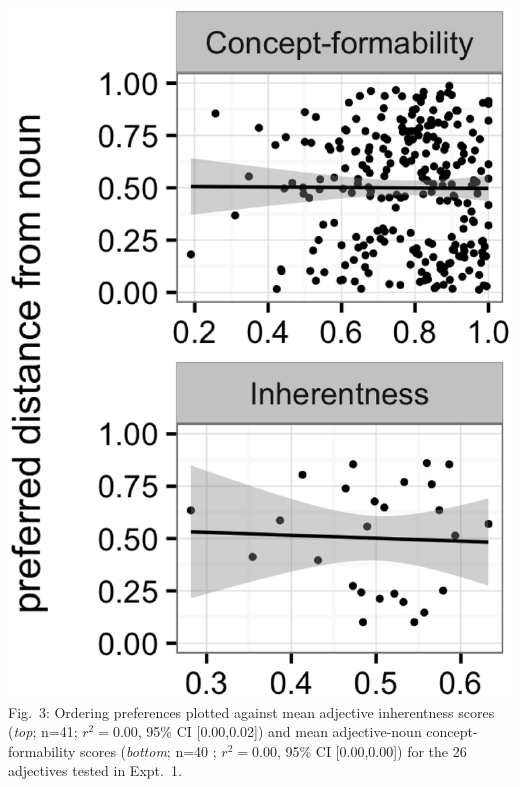 \documentclass[10pt]{article}
\begin{document}
\begin{minipage}[b]{.3\textwidth}
	\includegraphics[width=.95\linewidth]{plots/inherentness-concept.eps}\\
	Fig.~3: Ordering preferences plotted against mean adjective inherentness scores 
	(\emph{top}; n=41; $r^2=0.00$, 95\% CI [0.00,0.02]) and mean adjective-noun concept-formability scores (\emph{bottom}; n=40 ; $r^2=0.00$, 95\% CI [0.00,0.00]) for the 26 adjectives tested in Expt.~1.
\end{minipage}

%

\newpage

   
  
\end{document}
